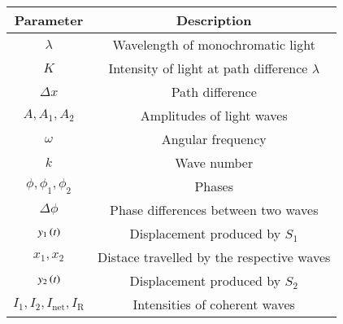 \begin{tabular}{|c|c|}
\hline 
   \textbf{Parameter}  &\textbf{Description} \\
\hline
     $\lambda$ & Wavelength of monochromatic light\\
\hline
$K$ & Intensity of light at path difference $\lambda$ \\
\hline
$\Delta x$ & Path difference \\
\hline
$A,A_1,A_2$ & Amplitudes of light waves \\
\hline
$\omega$ & Angular frequency \\
\hline
$k$ & Wave number \\ 
\hline
$\phi, \phi_1,\phi_2$ & Phases  \\
\hline
$\Delta \phi $ & Phase differences between two waves \\
\hline
$y_1\left(t\right)$ & Displacement produced by $S_1$ \\
\hline
$x_1,x_2$ & Distace travelled by the respective waves \\
\hline
$y_2\left(t\right)$ & Displacement produced by $S_2$ \\
\hline
$I_1,I_2,I_{\text{net}},I_{\text{R}}$ & Intensities of coherent waves \\
\hline
\end{tabular}
